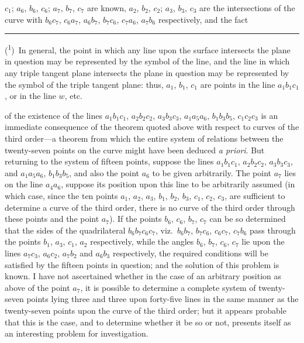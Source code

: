 \documentclass[11pt,a4paper]{book}
\begin{document}
$c_1$; $a_6$, $b_6$, $c_6$; $a_7$, $b_7$, $c_7$ are known, $a_2$, $b_2$, $c_2$; $a_3$, $b_3$, $c_3$ are the intersections of the curve with $b_6c_7$, $c_6a_7$, $a_6b_7$, $b_7c_6$, $c_7a_6$, $a_7b_6$ respectively, and the fact

\bigskip
\noindent\rule{0.3\textwidth}{0.4pt}

\noindent(\textsuperscript{1})~In general, the point in which any line upon the surface intersects the plane in question may be represented by the symbol of the line, and the line in which any triple tangent plane intersects the plane in question may be represented by the symbol of the triple tangent plane: thus, $a_1$, $b_1$, $c_1$ are points in the line $a_1b_1c_1$, or in the line $w$, etc.

\newpage

of the existence of the lines $a_1b_1c_1$, $a_2b_2c_2$, $a_3b_3c_3$, $a_1a_5a_6$, $b_1b_3b_5$, $c_1c_2c_3$ is an immediate consequence of the theorem quoted above with respect to curves of the third order---a theorem from which the entire system of relations between the twenty-seven points on the curve might have been deduced \textit{a priori}. But returning to the system of fifteen points, suppose the lines $a_1b_1c_1$, $a_2b_2c_2$, $a_3b_3c_3$, and $a_1a_5a_6$, $b_1b_3b_5$, and also the point $a_6$ to be given arbitrarily. The point $a_7$ lies on the line $a_4a_6$, suppose its position upon this line to be arbitrarily assumed (in which case, since the ten points $a_1$, $a_2$, $a_3$, $b_1$, $b_2$, $b_3$, $c_1$, $c_2$, $c_3$, are sufficient to determine a curve of the third order, there is no curve of the third order through these points and the point $a_7$). If the points $b_6$, $c_6$, $b_7$, $c_7$ can be so determined that the sides of the quadrilateral $b_6b_7c_6c_7$, viz.\ $b_6b_7$, $b_7c_6$, $c_6c_7$, $c_7b_6$ pass through the points $b_1$, $a_3$, $c_1$, $a_2$ respectively, while the angles $b_6$, $b_7$, $c_6$, $c_7$ lie upon the lines $a_7c_3$, $a_6c_2$, $a_7b_2$ and $a_6b_3$ respectively, the required conditions will be satisfied by the fifteen points in question; and the solution of this problem is known. I have not ascertained whether in the case of an arbitrary position as above of the point $a_7$, it is possible to determine a complete system of twenty-seven points lying three and three upon forty-five lines in the same manner as the twenty-seven points upon the curve of the third order; but it appears probable that this is the case, and to determine whether it be so or not, presents itself as an interesting problem for investigation.
\end{document}
